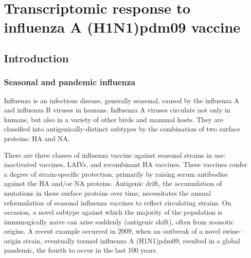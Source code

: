 %
%

\chapter{Transcriptomic response to influenza A (H1N1)pdm09 vaccine}
\label{ch:hird_DGE}

\section{Introduction}



\subsection{Seasonal and pandemic influenza}

Influenza is an infectious disease, generally seasonal, caused by the influenza A and influenza B viruses in humans.
Influenza A viruses circulate not only in humans, but also in a variety of other birds and mammal hosts.
They are classified into antigenically-distinct subtypes by the combination of two surface proteins: \gls{HA} and \gls{NA}\autocite{krammer2018Influenza}.

There are three classes of influenza vaccine against seasonal strains in use: inactivated vaccines, \glspl{LAIV}, and recombinant \gls{HA} vaccines.
These vaccines confer a degree of strain-specific protection, primarily by raising serum antibodies against the \gls{HA} and/or \gls{NA} proteins.
Antigenic drift, the accumulation of mutations in these surface proteins over time, necessitates the annual reformulation of seasonal influenza vaccines to reflect circulating strains\autocite{houser2015InfluenzaVaccinesChallenges, sautto2018UniversalInfluenzaVaccine}.
On occasion, a novel subtype against which the majority of the population is immunogically naive can arise suddenly (antigenic shift), often from zoonotic origins.
A recent example occurred in 2009, when an outbreak of a novel swine-origin strain, eventually termed influenza A (H1N1)pdm09, resulted in a global pandemic, the fourth to occur in the last 100 years\autocite{krammer2018Influenza}.
%


